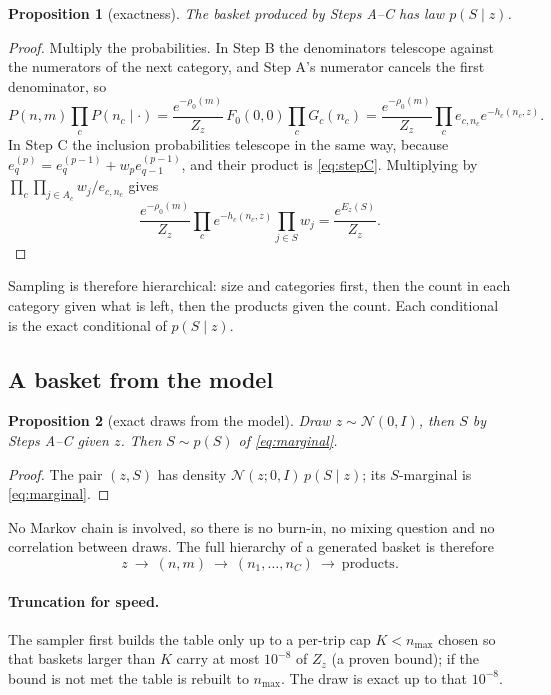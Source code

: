 \documentclass[11pt,a4paper]{article}
\newtheorem{proposition}{Proposition}
\theoremstyle{remark}
\newcommand{\N}{\mathcal N}
\begin{document}
\begin{proposition}[exactness]
The basket produced by Steps A--C has law $p(S\mid z)$.
\end{proposition}
\begin{proof}
Multiply the probabilities. In Step B the denominators telescope against the numerators of the next
category, and Step A's numerator cancels the first denominator, so
\[
P(n,m)\prod_{c}P(n_c\mid\cdot)=\frac{e^{-\rho_0(m)}}{Z_z}\,F_0(0,0)\prod_cG_c(n_c)
=\frac{e^{-\rho_0(m)}}{Z_z}\prod_c e_{c,n_c}e^{-h_c(n_c,z)} .
\]
In Step C the inclusion probabilities telescope in the same way, because $e^{(p)}_q=e^{(p-1)}_q+w_pe^{(p-1)}_{q-1}$,
and their product is \eqref{eq:stepC}. Multiplying by $\prod_c\prod_{j\in A_c}w_j/e_{c,n_c}$ gives
\[
\frac{e^{-\rho_0(m)}}{Z_z}\prod_c e^{-h_c(n_c,z)}\prod_{j\in S}w_j=\frac{e^{E_z(S)}}{Z_z}.
\]
\end{proof}

Sampling is therefore hierarchical: size and categories first, then the count in each category given what
is left, then the products given the count. Each conditional is the exact conditional of $p(S\mid z)$.

\subsection{A basket from the model}

\begin{proposition}[exact draws from the model]
Draw $z\sim\N(0,I)$, then $S$ by Steps A--C given $z$. Then $S\sim p(S)$ of \eqref{eq:marginal}.
\end{proposition}
\begin{proof}
The pair $(z,S)$ has density $\N(z;0,I)\,p(S\mid z)$; its $S$-marginal is \eqref{eq:marginal}.
\end{proof}
No Markov chain is involved, so there is no burn-in, no mixing question and no correlation between draws.
The full hierarchy of a generated basket is therefore
\[
z\ \to\ (n,m)\ \to\ (n_1,\dots,n_C)\ \to\ \text{products}.
\]

\paragraph{Truncation for speed.} The sampler first builds the table only up to a per-trip cap
$K<n_{\max}$ chosen so that baskets larger than $K$ carry at most $10^{-8}$ of $Z_z$ (a proven bound); if
the bound is not met the table is rebuilt to $n_{\max}$. The draw is exact up to that $10^{-8}$.
\end{document}

